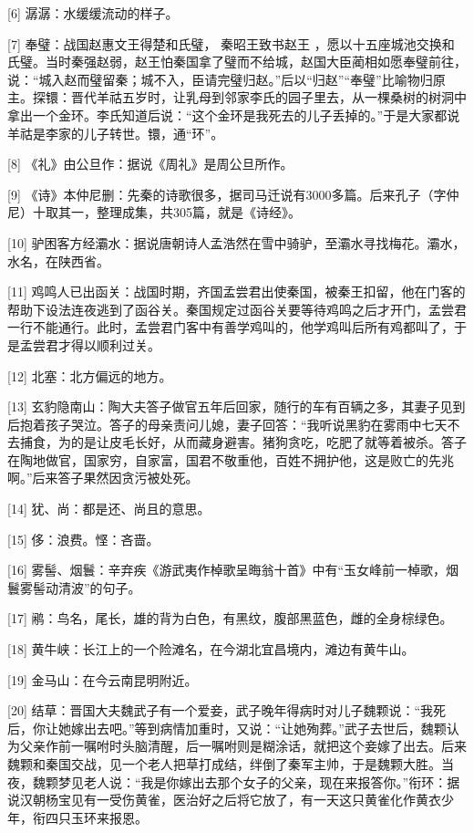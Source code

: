 \documentclass[12pt,UTF8]{ctexbook}
\begin{document}
[6] 潺潺：水缓缓流动的样子。

[7] 奉璧：战国赵惠文王得楚和氏璧， 秦昭王致书赵王 ，愿以十五座城池交换和氏璧。当时秦强赵弱，赵王怕秦国拿了璧而不给城，赵国大臣蔺相如愿奉璧前往，说：“城入赵而璧留秦；城不入，臣请完璧归赵。”后以“归赵”“奉璧”比喻物归原主。探镮：晋代羊祜五岁时，让乳母到邻家李氏的园子里去，从一棵桑树的树洞中拿出一个金环。李氏知道后说：“这个金环是我死去的儿子丢掉的。”于是大家都说羊祜是李家的儿子转世。镮，通“环”。

[8] 《礼》由公旦作：据说《周礼》是周公旦所作。

[9] 《诗》本仲尼删：先秦的诗歌很多，据司马迁说有3000多篇。后来孔子（字仲尼）十取其一，整理成集，共305篇，就是《诗经》。

[10] 驴困客方经灞水：据说唐朝诗人孟浩然在雪中骑驴，至灞水寻找梅花。灞水，水名，在陕西省。

[11] 鸡鸣人已出函关：战国时期，齐国孟尝君出使秦国，被秦王扣留，他在门客的帮助下设法连夜逃到了函谷关。秦国规定过函谷关要等待鸡鸣之后才开门，孟尝君一行不能通行。此时，孟尝君门客中有善学鸡叫的，他学鸡叫后所有鸡都叫了，于是孟尝君才得以顺利过关。

[12] 北塞：北方偏远的地方。

[13] 玄豹隐南山：陶大夫答子做官五年后回家，随行的车有百辆之多，其妻子见到后抱着孩子哭泣。答子的母亲责问儿媳，妻子回答：“我听说黑豹在雾雨中七天不去捕食，为的是让皮毛长好，从而藏身避害。猪狗贪吃，吃肥了就等着被杀。答子在陶地做官，国家穷，自家富，国君不敬重他，百姓不拥护他，这是败亡的先兆啊。”后来答子果然因贪污被处死。

[14] 犹、尚：都是还、尚且的意思。

[15] 侈：浪费。悭：吝啬。

[16] 雾髻、烟鬟：辛弃疾《游武夷作棹歌呈晦翁十首》中有“玉女峰前一棹歌，烟鬟雾髻动清波”的句子。

[17] 鹇：鸟名，尾长，雄的背为白色，有黑纹，腹部黑蓝色，雌的全身棕绿色。

[18] 黄牛峡：长江上的一个险滩名，在今湖北宜昌境内，滩边有黄牛山。

[19] 金马山：在今云南昆明附近。

[20] 结草：晋国大夫魏武子有一个爱妾，武子晚年得病时对儿子魏颗说：“我死后，你让她嫁出去吧。”等到病情加重时，又说：“让她殉葬。”武子去世后，魏颗认为父亲作前一嘱咐时头脑清醒，后一嘱咐则是糊涂话，就把这个妾嫁了出去。后来魏颗和秦国交战，见一个老人把草打成结，绊倒了秦军主帅，于是魏颗大胜。当夜，魏颗梦见老人说：“我是你嫁出去那个女子的父亲，现在来报答你。”衔环：据说汉朝杨宝见有一受伤黄雀，医治好之后将它放了，有一天这只黄雀化作黄衣少年，衔四只玉环来报恩。
\end{document}
